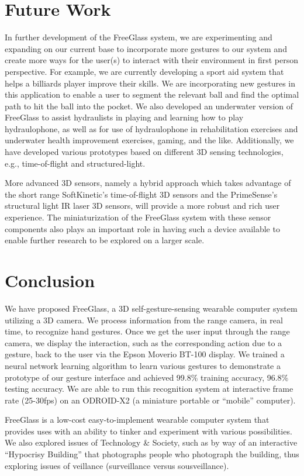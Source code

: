 \section{Future Work}
In further development of the FreeGlass system, we are experimenting and
expanding on our current base to incorporate more gestures to our system
and create more ways for the user(s) to interact with their environment in
first person perspective. For example, we are currently developing a sport
aid system that helps a billiards player improve their skills. We are
incorporating new gestures in this application to enable a user to segment
the relevant ball and find the optimal path to hit the ball into the pocket.
We also developed an underwater version of FreeGlass to assist hydraulists
in playing and learning how to play hydraulophone, as well as for use of
hydraulophone in rehabilitation exercises and underwater health improvement
exercises, gaming, and the like.
Additionally, we have developed various prototypes based on different 3D
sensing technologies, e.g., time-of-flight and structured-light.

More advanced 3D sensors, namely a hybrid approach which takes advantage
of the short range SoftKinetic's time-of-flight 3D sensors and
the PrimeSense's structural light IR laser 3D sensors, will provide a
more robust and rich user experience. The miniaturization of the FreeGlass
system with these sensor components also plays an important role in having
such a device available to enable further research
to be explored on a larger scale.

\section{Conclusion}
We have proposed FreeGlass, a 3D self-gesture-sensing wearable computer system utilizing a 3D camera.
We process information from the range camera, in real time, to recognize
hand gestures. Once we get the user input through the range camera, we
display the interaction, such as the corresponding action due to a gesture,
back to the user via the Epson Moverio BT-100 display. We trained a
neural network learning algorithm to learn various gestures
to demonstrate a prototype of our gesture interface
and achieved 99.8\% training accuracy, 96.8\% testing accuracy.
We are able to run this recognition system at interactive frame rate
(25-30fps) on an ODROID-X2 (a miniature portable or ``mobile'' computer).

FreeGlass is a low-cost easy-to-implement wearable computer system that
provides uses with an ability to tinker and experiment with various
possibilities.  We also explored issues of Technology \& Society,
such as by way of an interactive ``Hypocrisy Building'' that photographs
people who photograph the building, thus exploring issues of
veillance (surveillance versus sousveillance).


